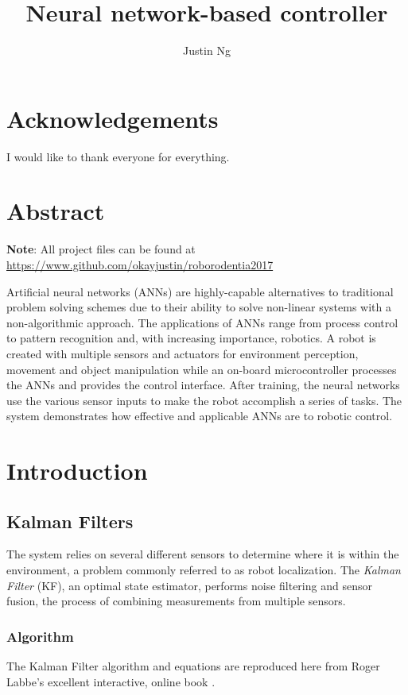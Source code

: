 \documentclass[12pt,letterpaper,titlepage]{report}
\title{Neural network-based controller}
\author{Justin Ng}
\begin{document}

\newpage
{}
\tableofcontents
\listoffigures
\listoftables


\chapter*{Acknowledgements}
I would like to thank everyone for everything.


\chapter*{Abstract}
\textbf{Note}: All project files can be found at \url{https://www.github.com/okayjustin/roborodentia2017} \

Artificial neural networks (ANNs) are highly-capable alternatives to traditional problem solving schemes due to their ability to solve non-linear systems with a non-algorithmic approach. The applications of ANNs range from process control to pattern recognition and, with increasing importance, robotics. A robot is created with multiple sensors and actuators for environment perception, movement and object manipulation while an on-board microcontroller processes the ANNs and provides the control interface. After training, the neural networks use the various sensor inputs to make the robot accomplish a series of tasks. The system demonstrates how effective and applicable ANNs are to robotic control. 


\chapter{Introduction}
\section{Kalman Filters}
The system relies on several different sensors to determine where it is within the environment, a problem commonly referred to as robot localization. The \textit{Kalman Filter} (KF), an optimal state estimator, performs noise filtering and sensor fusion, the process of combining measurements from multiple sensors. 

\subsection{Algorithm}
The Kalman Filter algorithm and equations are reproduced here from Roger Labbe's excellent interactive, online book \autocite{labbe_2017}.
\end{document}
